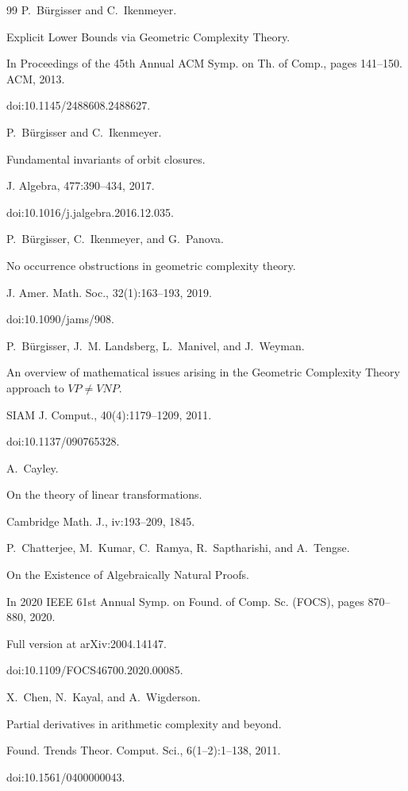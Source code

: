 \documentclass[10pt,a4paper]{article}
\begin{document}
\begin{thebibliography}{99}
P. Bürgisser and C. Ikenmeyer.


Explicit Lower Bounds via Geometric Complexity Theory.


In Proceedings of the 45th Annual ACM Symp. on Th. of Comp.,
pages 141–150. ACM, 2013.


doi:10.1145/2488608.2488627.

P. Bürgisser and C. Ikenmeyer.


Fundamental invariants of orbit closures.


J. Algebra, 477:390–434, 2017.


doi:10.1016/j.jalgebra.2016.12.035.

P. Bürgisser, C. Ikenmeyer, and G. Panova.


No occurrence obstructions in geometric complexity theory.


J. Amer. Math. Soc., 32(1):163–193, 2019.


doi:10.1090/jams/908.

P. Bürgisser, J. M. Landsberg, L. Manivel, and J. Weyman.


An overview of mathematical issues arising in the Geometric
Complexity Theory approach to $VP\neq VNP$.


SIAM J. Comput., 40(4):1179–1209, 2011.


doi:10.1137/090765328.

A. Cayley.


On the theory of linear transformations.


Cambridge Math. J., iv:193–209, 1845.

P. Chatterjee, M. Kumar, C. Ramya, R. Saptharishi, and A. Tengse.


On the Existence of Algebraically Natural Proofs.


In 2020 IEEE 61st Annual Symp. on Found. of Comp. Sc. (FOCS),
pages 870–880, 2020.


Full version at arXiv:2004.14147.


doi:10.1109/FOCS46700.2020.00085.

X. Chen, N. Kayal, and A. Wigderson.


Partial derivatives in arithmetic complexity and beyond.


Found. Trends Theor. Comput. Sci., 6(1–2):1–138, 2011.


doi:10.1561/0400000043.


\end{thebibliography}
\end{document}
